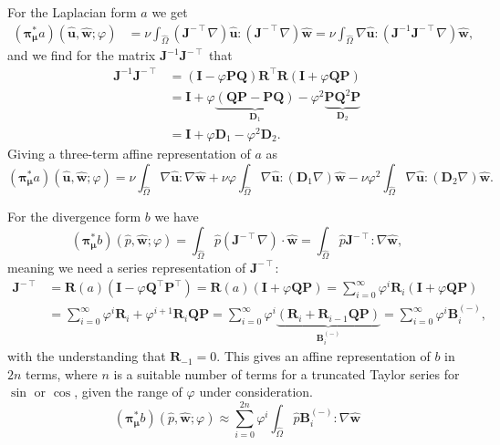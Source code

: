 \documentclass[onecolumn, twoside, a4paper, 11pt]{article}
\begin{document}
For the Laplacian form $a$ we get
\begin{align}
  ({\bm\pi}^*_{\bm\mu}a)(
    \hat{\bm u},
    \hat{\bm w};
    \varphi
  )
  &= \nu \int_{\hat{\Omega}} (\bm J^{-\intercal} \nabla) \hat{\bm u} : (\bm J^{-\intercal} \nabla) \hat{\bm w}
  = \nu \int_{\hat{\Omega}} \nabla \hat{\bm u} : (\bm J^{-1} \bm J^{-\intercal} \nabla) \hat{\bm w},
\end{align}
and we find for the matrix $\bm J^{-1} \bm J^{-\intercal}$ that
\begin{align}
  \nonumber
  \bm J^{-1} \bm J^{-\intercal}
  &= (\bm I - \varphi \bm P \bm Q) \bm R^\intercal
    \bm R (\bm I + \varphi \bm Q \bm P) \\
  \nonumber
  &= \bm I + \varphi \underbrace{(\bm Q \bm P - \bm P \bm Q)}_{\bm D_1}
    - \varphi^2 \underbrace{\bm P \bm Q^2 \bm P}_{\bm D_2} \\
  &= \bm I + \varphi \bm D_1 - \varphi^2 \bm D_2.
\end{align}
Giving a three-term affine representation of $a$ as
\begin{equation}
  ({\bm\pi}^*_{\bm\mu}a)(
    \hat{\bm u},
    \hat{\bm w};
    \varphi
  ) =
  \nu \int_{\hat{\Omega}} \nabla \hat{\bm u} : \nabla \hat{\bm w}
  + \nu \varphi \int_{\hat{\Omega}}
  \nabla \hat{\bm u} : (\bm D_1 \nabla) \hat{\bm w}
  - \nu \varphi^2 \int_{\hat{\Omega}}
  \nabla \hat{\bm u} : (\bm D_2 \nabla) \hat{\bm w}.
\end{equation}

For the divergence form $b$ we have
\begin{equation}
  ({\bm\pi}^*_{\bm\mu}b)(
    \hat{p},
    \hat{\bm w};
    \varphi
  ) =
  \int_{\hat{\Omega}} \hat{p} (\bm J^{-\intercal} \nabla) \cdot \hat{\bm w}
  = \int_{\hat{\Omega}} \hat{p} \bm J^{-\intercal} : \nabla \hat{\bm w},
\end{equation}
meaning we need a series representation of $\bm J^{-\intercal}$:
\begin{align}
  \nonumber
  \bm J^{-\intercal}
  &= \bm R(a) (\bm I - \varphi \bm Q^\intercal \bm P^\intercal)
  = \bm R(a) (\bm I + \varphi \bm Q \bm P)
  = \sum_{i=0}^\infty
    \varphi^i \bm R_i
    (\bm I + \varphi \bm Q \bm P) \\
  &= \sum_{i=0}^\infty
    \varphi^i \bm R_i
    + \varphi^{i+1} \bm R_i \bm Q \bm P
  = \sum_{i=0}^\infty
    \varphi^i \underbrace{\left(
    \bm R_i + \bm R_{i-1} \bm Q \bm P
    \right)}_{\bm B^{(-)}_i}
  = \sum_{i=0}^\infty \varphi^i \bm B^{(-)}_i,
\end{align}
with the understanding that $\bm R_{-1} = 0$. This gives an affine
representation of $b$ in $2n$ terms, where $n$ is a suitable number of terms for
a truncated Taylor series for $\sin$ or $\cos$, given the range of $\varphi$
under consideration.
\begin{equation}
  ({\bm\pi}^*_{\bm\mu}b)(
    \hat{p},
    \hat{\bm w};
    \varphi
  ) \approx \sum_{i=0}^{2n} \varphi^i
  \int_{\hat{\Omega}} \hat{p} \bm B^{(-)}_i : \nabla \hat{\bm w}
\end{equation}
\end{document}
